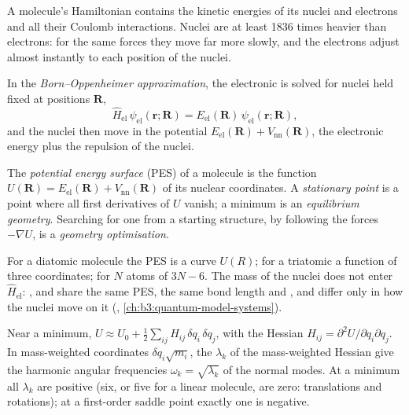 A molecule's Hamiltonian contains the kinetic energies of its nuclei and
electrons and all their Coulomb interactions. Nuclei are at least 1836
times heavier than electrons: for the same forces they move far more
slowly, and the electrons adjust almost instantly to each position of the
nuclei.

\begin{definition}\label{def:b3:computational-chemistry:born-oppenheimer}
In the \emph{Born--Oppenheimer approximation},
the electronic  is solved for nuclei
held fixed at positions $\mathbf R$,
\[
\hat H_{\mathrm{el}}\,\psi_{\mathrm{el}}(\mathbf r;\mathbf R) =
E_{\mathrm{el}}(\mathbf R)\,\psi_{\mathrm{el}}(\mathbf r;\mathbf R),
\]
and the nuclei then move in the potential $E_{\mathrm{el}}(\mathbf R) +
V_{\mathrm{nn}}(\mathbf R)$, the electronic energy plus the repulsion of the
nuclei.
\end{definition}

\begin{definition}\label{def:b3:computational-chemistry:pes}
The \emph{potential energy surface} (PES) of
a molecule is the function $U(\mathbf R) = E_{\mathrm{el}}(\mathbf R) +
V_{\mathrm{nn}}(\mathbf R)$ of its nuclear coordinates. A \emph{stationary
point} is a point where all first derivatives of $U$
vanish; a minimum is an \emph{equilibrium geometry}.
Searching for one from a starting structure, by following the
forces $-\nabla U$, is a \emph{geometry optimisation}.
\end{definition}

For a diatomic molecule the PES is a curve $U(R)$; for a triatomic a
function of three coordinates; for $N$ atoms of $3N - 6$. The mass of the
nuclei does not enter $\hat H_{\mathrm{el}}$: ,  and  share the
same PES, the same bond length and , and differ only in how
the nuclei move on it (, \cref{ch:b3:quantum-model-systems}).

\begin{proposition}\label{prop:b3:computational-chemistry:hessian}
Near a minimum, $U \approx U_0 + \frac12\sum_{ij}H_{ij}\,\delta q_i\,\delta q_j$, with
the Hessian $H_{ij} = \partial^2U/\partial q_i\partial q_j$. In mass-weighted
coordinates $\delta q_i\sqrt{m_i}$, the  $\lambda_k$ of the
mass-weighted Hessian give the harmonic angular frequencies $\omega_k =
\sqrt{\lambda_k}$ of the normal modes. At a minimum all $\lambda_k$ are
positive (six, or five for a linear molecule, are zero: translations and
rotations); at a first-order saddle point exactly one is negative.
\end{proposition}

